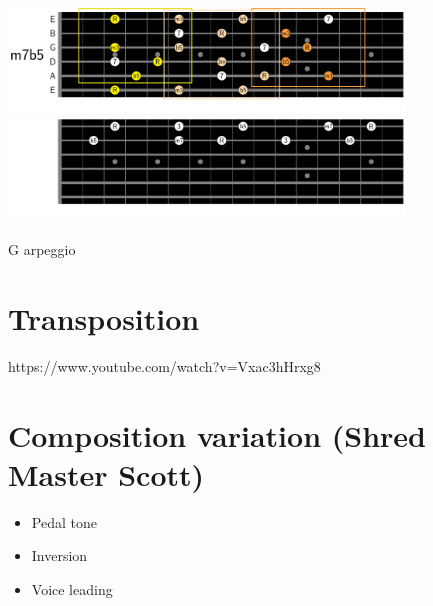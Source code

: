 \documentclass{article}
\begin{document}
\begin{table}[!h]
	\hspace*{-4cm}
	\includegraphics[width=10.5cm, trim= {0cm 0cm 0cm 0cm}, clip]{Arpeges/m7b5_chords.pdf}
	\hspace*{-1cm}
	\includegraphics[width=10.5cm, trim= {0cm 0cm 0cm 0cm}, clip]{Arpeges/2notes_m7b5_chords.pdf}
	\caption{G arpeggio}
	\label{fig}
\end{table}


\newpage
\section{Transposition}

https://www.youtube.com/watch?v=Vxac3hHrxg8




\newpage
\section{Composition variation (Shred Master Scott)}

\begin{itemize}
	\item Pedal tone
	\item Inversion
	\item Voice leading
\end{itemize}

\newpage


\end{document}
